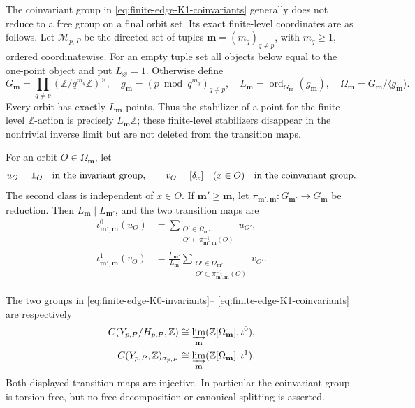 The coinvariant group in \eqref{eq:finite-edge-K1-coinvariants} generally
does not reduce to a free group on a final orbit set.  Its exact finite-level
coordinates are as follows.  Let \(\mathcal M_{p,P}\) be the directed set of
tuples \(\mathbf m=(m_q)_{q\ne p}\), with \(m_q\geq1\), ordered
coordinatewise.  For an empty tuple set all objects below equal to the
one-point object and put \(L_{\varnothing}=1\).  Otherwise define
\begin{equation}
 G_{\mathbf m}=\prod_{q\ne p}
 (\mathbb Z/q^{m_q}\mathbb Z)^\times,
 \quad
 g_{\mathbf m}=(p\bmod q^{m_q})_{q\ne p},
 \quad
 L_{\mathbf m}=\operatorname{ord}_{G_{\mathbf m}}(g_{\mathbf m}),
 \quad
 \Omega_{\mathbf m}=G_{\mathbf m}/\langle g_{\mathbf m}\rangle.
 \label{eq:finite-orbit-coordinate-data}
\end{equation}
Every orbit has exactly \(L_{\mathbf m}\) points.  Thus the stabilizer of a
point for the finite-level \(\mathbb Z\)-action is precisely
\(L_{\mathbf m}\mathbb Z\); these finite-level stabilizers disappear in the
nontrivial inverse limit but are not deleted from the transition maps.

For an orbit \(O\in\Omega_{\mathbf m}\), let
\[
 u_O=\mathbf1_O
 \quad\hbox{in the invariant group},
 \qquad
 v_O=[\delta_x]\quad(x\in O)
 \quad\hbox{in the coinvariant group}.
\]
The second class is independent of \(x\in O\).  If
\(\mathbf m'\geq\mathbf m\), let
\(\pi_{\mathbf m',\mathbf m}:G_{\mathbf m'}\to G_{\mathbf m}\) be reduction.
Then \(L_{\mathbf m}\mid L_{\mathbf m'}\), and the two transition maps are
\begin{align}
 \iota^0_{\mathbf m',\mathbf m}(u_O)
 &=\sum_{\substack{O'\in\Omega_{\mathbf m'}\\
                    O'\subset\pi_{\mathbf m',\mathbf m}^{-1}(O)}}u_{O'},
 \label{eq:finite-invariant-transition}\\
 \iota^1_{\mathbf m',\mathbf m}(v_O)
 &=\frac{L_{\mathbf m'}}{L_{\mathbf m}}
   \sum_{\substack{O'\in\Omega_{\mathbf m'}\\
                    O'\subset\pi_{\mathbf m',\mathbf m}^{-1}(O)}}v_{O'}.
 \label{eq:finite-coinvariant-transition}
\end{align}

\begin{proposition}
\label{prop:unit-fibre-finite-level-limits}
The two groups in
\eqref{eq:finite-edge-K0-invariants}--
\eqref{eq:finite-edge-K1-coinvariants} are respectively
\begin{align}
 C(Y_{p,P}/H_{p,P},\mathbb Z)
 &\cong
 \varinjlim_{\mathbf m}
 (\mathbb Z[\Omega_{\mathbf m}],\iota^0),
 \label{eq:finite-invariant-direct-limit}\\
 C(Y_{p,P},\mathbb Z)_{\sigma_{p,P}}
 &\cong
 \varinjlim_{\mathbf m}
 (\mathbb Z[\Omega_{\mathbf m}],\iota^1).
 \label{eq:finite-coinvariant-direct-limit}
\end{align}
Both displayed transition maps are injective.  In particular the
coinvariant group is torsion-free, but no free decomposition or canonical
splitting is asserted.
\end{proposition}

